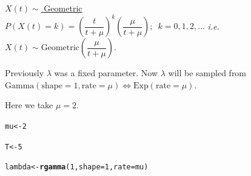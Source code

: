 \documentclass[11pt, a4paper]{article}\usepackage[]{graphicx}\usepackage[]{xcolor}
\makeatletter
\newcommand{\hlnum}[1]{\textcolor[rgb]{0.686,0.059,0.569}{#1}}%
\newcommand{\hldef}[1]{\textcolor[rgb]{0.345,0.345,0.345}{#1}}%
\newcommand{\hlkwb}[1]{\textcolor[rgb]{0.69,0.353,0.396}{#1}}%
\newcommand{\hlkwc}[1]{\textcolor[rgb]{0.333,0.667,0.333}{#1}}%
\newcommand{\hlkwd}[1]{\textcolor[rgb]{0.737,0.353,0.396}{\textbf{#1}}}%
\newenvironment{kframe}{%
 \def\at@end@of@kframe{}%
 \ifinner\ifhmode%
  \def\at@end@of@kframe{\end{minipage}}%
  \begin{minipage}{\columnwidth}%
 \fi\fi%
 \def\FrameCommand##1{\hskip\@totalleftmargin \hskip-\fboxsep
 \colorbox{shadecolor}{##1}\hskip-\fboxsep
     \hskip-\linewidth \hskip-\@totalleftmargin \hskip\columnwidth}%
 \MakeFramed {\advance\hsize-\width
   \@totalleftmargin\z@ \linewidth\hsize
   \@setminipage}}%
 {\par\unskip\endMakeFramed%
 \at@end@of@kframe}
\newenvironment{knitrout}{}{} %
\makeatother
\begin{document}
\newpage

\faArrowAltCircleRight[regular] \hspace{0.2cm} \underline{$ X(t) \sim $ Geometric}\\[1em]

$P(X(t) = k) = \left( \dfrac{t}{t+\mu} \right)^k \left( \dfrac{\mu}{t+\mu} \right); \,\,\, k = 0, 1, 2, \ldots$ \textit{i.e.} $X(t) \sim \text{Geometric} \left( \dfrac{\mu}{t+\mu} \right). $ \\

\vspace{0.2cm}

Previously $\lambda$ was a fixed parameter. Now $\lambda$ will be sampled from $\text{Gamma}(\text{shape} = 1, \text{rate} = \mu) \Leftrightarrow \text{Exp}(\text{rate} = \mu).$

Here we take $\mu = 2$.

\begin{knitrout}
\color{fgcolor}\begin{kframe}
\begin{alltt}
\hldef{mu} \hlkwb{<-} \hlnum{2}
\end{alltt}
\end{kframe}
\end{knitrout}

\begin{knitrout}
\color{fgcolor}\begin{kframe}
\begin{alltt}
\hldef{T} \hlkwb{<-} \hlnum{5}

\hldef{lambda} \hlkwb{<-} \hlkwd{rgamma}\hldef{(}\hlnum{1}\hldef{,} \hlkwc{shape} \hldef{=} \hlnum{1}\hldef{,} \hlkwc{rate} \hldef{= mu)}
\end{alltt}
\end{kframe}
\end{knitrout}
\end{document}
